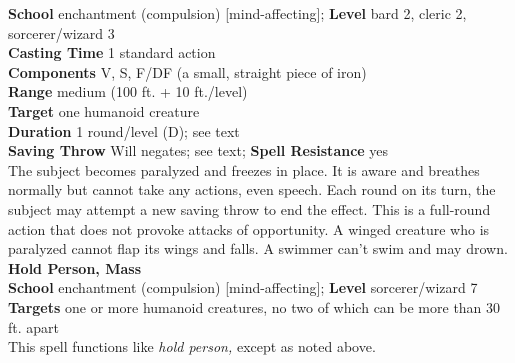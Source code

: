 \textbf{School} enchantment (compulsion) [mind-affecting]; \textbf{Level} bard 2, cleric 2, sorcerer/wizard 3\\
\textbf{Casting Time} 1 standard action\\
\textbf{Components} V, S, F/DF (a small, straight piece of iron)\\
\textbf{Range }medium (100 ft. + 10 ft./level)\\
\textbf{Target} one humanoid creature\\
\textbf{Duration} 1 round/level (D); see text\\
\textbf{Saving Throw }Will negates; see text; \textbf{Spell Resistance} yes\\
The subject becomes paralyzed and freezes in place. It is aware and breathes normally but cannot take any actions, even speech. Each round on its turn, the subject may attempt a new saving throw to end the effect. This is a full-round action that does not provoke attacks of opportunity. A winged creature who is paralyzed cannot flap its wings and falls. A swimmer can't swim and may drown.\\
\textbf{Hold Person, Mass}\\
\textbf{School} enchantment (compulsion) [mind-affecting]; \textbf{Level} sorcerer/wizard 7\\
\textbf{Targets} one or more humanoid creatures, no two of which can be more than 30 ft. apart\\
This spell functions like \textit{hold person, }except as noted above.\\
